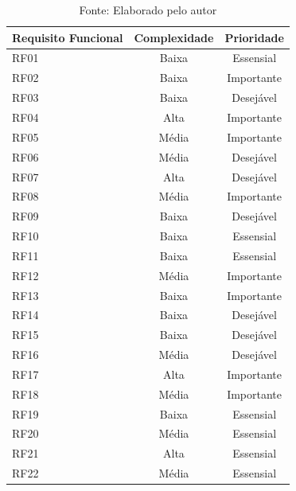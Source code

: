 \begin{table}[htb]
    \centering
    \caption{Grau de complexidade e prioridade dos requisitos funcinoais.}
    \begin{tabular}{|l|c|c|}
        \hline
        \textbf{Requisito Funcional} & \textbf{Complexidade} & \textbf{Prioridade}\\
        \hline
        RF01 & Baixa & Essensial\\
        \hline
        RF02 & Baixa & Importante\\
        \hline
        RF03 & Baixa & Desejável\\
        \hline
        RF04 & Alta & Importante\\
        \hline
        RF05 & Média & Importante\\
        \hline
        RF06 & Média & Desejável\\
        \hline
        RF07 & Alta & Desejável\\
        \hline
        RF08 & Média & Importante\\
        \hline
        RF09 & Baixa & Desejável\\
        \hline
        RF10 & Baixa & Essensial\\
        \hline
        RF11 & Baixa & Essensial\\
        \hline
        RF12 & Média & Importante\\
        \hline
        RF13 & Baixa & Importante\\
        \hline
        RF14 & Baixa & Desejável\\
        \hline
        RF15 & Baixa & Desejável\\
        \hline
        RF16 & Média & Desejável\\
        \hline
        RF17 & Alta & Importante\\
        \hline
        RF18 & Média & Importante\\
        \hline
        RF19 & Baixa & Essensial\\
        \hline
        RF20 & Média & Essensial\\
        \hline
        RF21 & Alta & Essensial\\
        \hline
        RF22 & Média & Essensial\\
        \hline
        \hline
    \end{tabular}    
    \caption*{\small Fonte: Elaborado pelo autor}
    \label{tab:Plataformas2}
\end{table}

